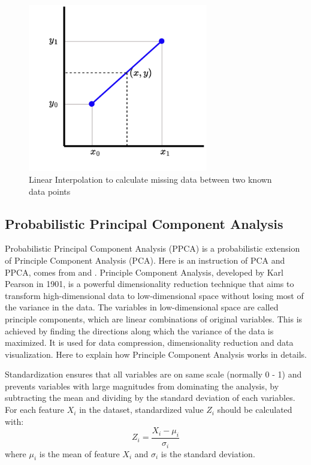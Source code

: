 \documentclass[12pt,a4paper,english
]{tunithesis}
\begin{document}
\begin{figure}
  \begin{center}
    \includegraphics[width=0.7\textwidth]{thesis/img/linear_impute.pdf}
  \end{center}
  \caption[Linear Interpolation]{Linear Interpolation to calculate missing data between two known data points}
  \label{fig:linear_impute_fig}
\end{figure}

\subsection{Probabilistic Principal Component Analysis}
Probabilistic Principal Component Analysis (PPCA) is a probabilistic extension of Principle Component Analysis (PCA). Here is an instruction of PCA and PPCA, comes from \textcite{lindsay2002} and \textcite{tipping2002}.
Principle Component Analysis, developed by Karl Pearson in 1901, is a powerful dimensionality reduction technique that aims to transform high-dimensional data to low-dimensional space without losing most of the variance in the data. \parencite{mackiewicz1993} The variables in low-dimensional space are called principle components, which are linear combinations of original variables. This is achieved by finding the directions along which the variance of the data is maximized. It is used for data compression, dimensionality reduction and data visualization. Here to explain how Principle Component Analysis works in details.

Standardization ensures that all variables are on same scale (normally 0 - 1) and prevents variables with large magnitudes from dominating the analysis, by subtracting the mean and dividing by the standard deviation of each variables. For each feature $X_i$ in the dataset, standardized value $Z_i$ should be calculated with: %
\begin{equation}
    \label{eq:ppca_standardized_value}
    {Z_i} = {\frac {{X_i}-{\mu_i}}{\sigma_i}}
\end{equation}
where $\mu_i$ is the mean of feature $X_i$ and $\sigma_i$ is the standard deviation.
\end{document}
